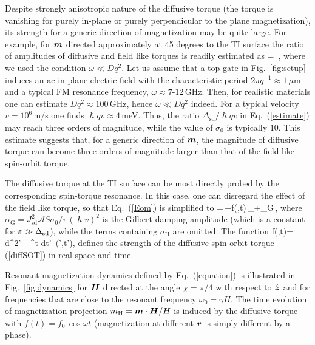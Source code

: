 Despite strongly anisotropic nature of the diffusive torque (the torque is vanishing for purely in-plane or purely perpendicular to the plane magnetization), its strength for a generic direction of magnetization may be quite large. For example, for $\boldsymbol{m}$ directed approximately at 45 degrees to the TI surface the ratio of amplitudes of diffusive and field like torques is readily estimated as  
\be
\label{estimate}
 = \,,
\e
where we used the condition $\omega \ll Dq^2$.  Let us assume that a top-gate in Fig.~\ref{fig:setup} induces an ac in-plane electric field with the characteristic period $2\pi q^{-1}\approx 1$\,$\mu$m and a typical FM resonance frequency, $\omega\approx 7$-$12$\,GHz. Then, for realistic materials one can estimate $Dq^2\approx 100$\,GHz, hence $\omega \ll Dq^2$ indeed. For a typical velocity $v=10^6$\,m$/$s one finds  $\hslash q v\approx 4$\,meV. Thus, the ratio $\Delta_\textrm{sd}/\hslash q v$ in Eq.~(\ref{estimate}) may reach three orders of magnitude, while the value of $\sigma_0$ is typically $10$. This estimate suggests that, for a generic direction of $\boldsymbol{m}$, the magnitude of diffusive  torque can become three orders of magnitude larger than that of the field-like spin-orbit torque. 

The diffusive torque at the TI surface can be most directly probed by the corresponding spin-torque resonance. In this case, one can disregard the effect of the field like torque, so that Eq.~(\ref{Eom}) is simplified to
\be
\label{equation}
=\gamma\,\times {}+f(,t)\,\times{}_\perp+\alpha_\textrm{G}\,\times{},
\e
where $\alpha_\textrm{G}= J_\textrm{sd}^2 \mathcal{A}S \sigma_0/\pi(\hslash v)^2$ is the Gilbert damping amplitude (which is a constant for $\varepsilon \gg \Delta_\textrm{sd}$), while the terms containing $\sigma_\textrm{H}$ are omitted.  The function
\be
f(,t)=\eta\int\! d^2'\!\!\int_{-\infty}^t\!\!\!\! dt'\, \bb{\nabla}\cdot{}(',t'),
\e
defines the strength of the diffusive spin-orbit torque (\ref{diffSOT}) in real space and time.

Resonant magnetization dynamics defined by Eq.~(\ref{equation}) is illustrated in Fig.~\ref{fig:dynamics} for $\boldsymbol{H}$ directed at the angle $\chi =\pi/4$ with respect to $\hat{\boldsymbol{z}}$ and for frequencies that are close to the resonant frequency $\omega_0=\gamma H$. The time evolution of magnetization projection $m_\textrm{H}= \boldsymbol{m}\cdot \boldsymbol{H}/H$ is induced by the diffusive torque with $f(t)= f_0\,\cos\omega t$ (magnetization at different $\boldsymbol{r}$ is simply different by a phase). 

